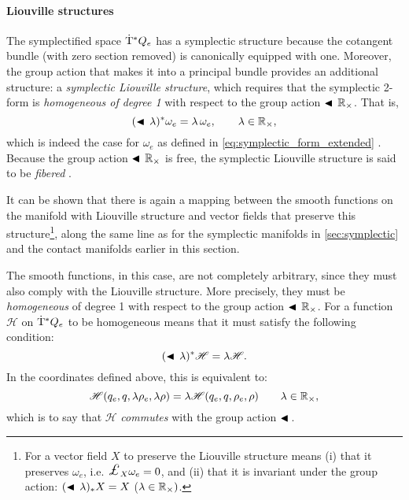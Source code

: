 \paragraph{Liouville structures} The symplectified space \(\mathrm{\dot{T}}^*Q_e\) has a symplectic structure because the cotangent bundle (with zero section removed) is canonically equipped with one. Moreover, the group action that makes it into a principal bundle provides an additional structure: a \emph{symplectic Liouville structure}, which requires that the symplectic 2-form is \emph{homogeneous of degree 1} with respect to the group action \(\blacktriangleleft\,\mathbb{R}_{\times}\). That is,
\begin{equation}
     (\blacktriangleleft\,\lambda)^* \omega_e = \lambda\,\omega_e, \qquad \lambda \in \mathbb{R}_{\times},
\end{equation}
which is indeed the case for \(\omega_e\) as defined in \cref{eq:symplectic_form_extended} \cite{Libermann1987}. Because the group action \(\blacktriangleleft\,\mathbb{R}_{\times}\) is free, the symplectic Liouville structure is said to be \emph{fibered} \cite{Libermann1987}.

It can be shown that there is again a mapping between the smooth functions on the manifold with Liouville structure and vector fields that preserve this structure\footnote
{For a vector field \(X\) to preserve the Liouville structure means (i) that it preserves \(\omega_e\), i.e. \(\lied{X}{\omega_e} = 0\), and (ii) that it is invariant under the group action: \( (\blacktriangleleft\,\lambda)_* X = X\) (\(\lambda \in \mathbb{R}_{\times})\). }, along the same line as for the symplectic manifolds in \cref{sec:symplectic} and the contact manifolds earlier in this section.

The smooth functions, in this case, are not completely arbitrary, since they must also comply with the Liouville structure. More precisely, they must be \emph{homogeneous} of degree 1 with respect to the group action \(\blacktriangleleft\,\mathbb{R}_{\times}\). For a function \(\mathscr{H}\) on \(\mathrm{\dot{T}}^*Q_e\) to be homogeneous means that it must satisfy the following condition:
\begin{equation}
     (\blacktriangleleft\,\lambda )^* \mathscr{H} = \lambda \mathscr{H}.
\end{equation}
In the coordinates defined above, this is equivalent to:
\begin{equation}
     \mathscr{H}(q_e, q, \lambda \rho_e, \lambda \rho) = \lambda\mathscr{H}(q_e, q, \rho_e, \rho) \qquad \lambda \in \mathbb{R}_{\times},
\end{equation}
which is to say that \(\mathscr{H}\) \emph{commutes} with the group action $\blacktriangleleft\,$.

